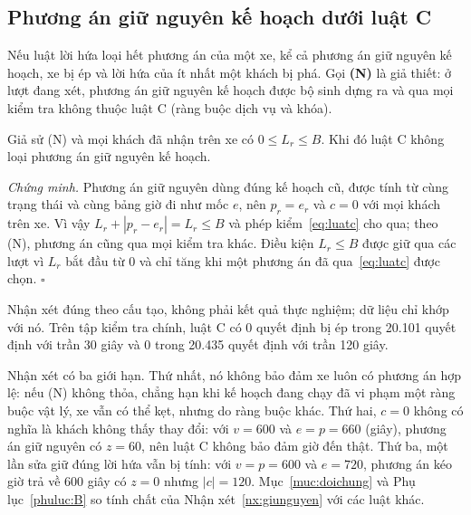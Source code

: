 \subsection{Phương án giữ nguyên kế hoạch dưới luật C}
\label{muc:giunguyen}

Nếu luật lời hứa loại hết phương án của một xe, kể cả phương án giữ nguyên kế hoạch, xe bị ép và lời hứa
của ít nhất một khách bị phá. Gọi \textbf{(N)} là giả thiết: ở lượt đang xét, phương án giữ nguyên kế
hoạch được bộ sinh dựng ra và qua mọi kiểm tra không thuộc luật C (ràng buộc dịch vụ và khóa).

\begin{nhanxet}
\label{nx:giunguyen}
Giả sử (N) và mọi khách đã nhận trên xe có $0 \le L_r \le B$. Khi đó luật C không loại phương án giữ
nguyên kế hoạch.
\end{nhanxet}

\noindent\textit{Chứng minh.} Phương án giữ nguyên dùng đúng kế hoạch cũ, được tính từ cùng trạng thái
và cùng bảng giờ đi như mốc $e$, nên $p_r = e_r$ và $c = 0$ với mọi khách trên xe. Vì vậy
$L_r + |p_r - e_r| = L_r \le B$ và phép kiểm~\eqref{eq:luatc} cho qua; theo (N), phương án cũng qua mọi
kiểm tra khác. Điều kiện $L_r \le B$ được giữ qua các lượt vì $L_r$ bắt đầu từ 0 và chỉ tăng khi một
phương án đã qua~\eqref{eq:luatc} được chọn. \hfill$\square$

Nhận xét đúng theo cấu tạo, không phải kết quả thực nghiệm; dữ liệu chỉ khớp với nó. Trên tập kiểm tra
chính, luật C có 0 quyết định bị ép trong 20.101 quyết định với trần 30 giây và 0 trong 20.435 quyết định
với trần 120 giây.

Nhận xét có ba giới hạn. Thứ nhất, nó không bảo đảm xe luôn có phương án hợp lệ: nếu (N) không thỏa,
chẳng hạn khi kế hoạch đang chạy đã vi phạm một ràng buộc vật lý, xe vẫn có thể kẹt, nhưng do ràng buộc
khác. Thứ hai, $c = 0$ không có nghĩa là khách không thấy thay đổi: với $v = 600$ và $e = p = 660$
(giây), phương án giữ nguyên có $z = 60$, nên luật C không bảo đảm giờ đến thật. Thứ ba, một lần sửa giữ
đúng lời hứa vẫn bị tính: với $v = p = 600$ và $e = 720$, phương án kéo giờ trả về 600 giây có $z = 0$
nhưng $|c| = 120$. Mục~\ref{muc:doichung} và Phụ lục~\ref{phuluc:B} so tính chất của
Nhận xét~\ref{nx:giunguyen} với các luật khác.

